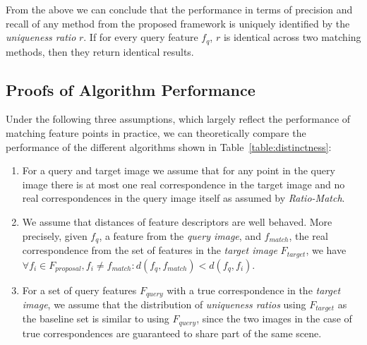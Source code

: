 \documentclass[10pt,journal,cspaper,compsoc]{IEEEtran}
\begin{document}
From the above we can conclude that the performance in terms of 
precision and recall of any method from the proposed framework is 
uniquely identified by the \emph{uniqueness ratio} $r$.  If for every query 
feature $f_{q}$, $r$ is identical across two matching methods, then they 
return identical results. 


\subsection{Proofs of Algorithm Performance}
\label{S:Proofs}

Under the following three assumptions, which largely reflect the performance of 
matching feature points in practice, we can theoretically compare the 
performance of the different algorithms shown in 
Table~\ref{table:distinctness}:
\begin{enumerate}
    \item{For a query and target image we assume that for any point in 
        the query image there is at most one real correspondence in the 
    target image and no real correspondences in the query image itself 
as assumed by \emph{Ratio-Match}.}
    \item{We assume that distances of feature descriptors are well 
            behaved.  More precisely, given $f_q$, a feature from the 
            \emph{query image}, and $f_{match}$, the real correspondence 
            from the set of features in the \emph{target image} 
            $F_{target}$, we have $\forall f_i \in F_{proposal}, 
            f_i \neq f_{match}: d(f_q,f_{match}) < d(f_q, f_i)$.}
     \item{For a set of query features $F_{query}$ with a true 
             correspondence in the \emph{target image}, we assume that 
             the distribution of \emph{uniqueness ratios} using $F_{target}$ as 
             the baseline set is similar to using $F_{query}$, since the 
         two images in the case of true correspondences are guaranteed 
     to share part of the same scene.}
    \end{enumerate}
\end{document}
